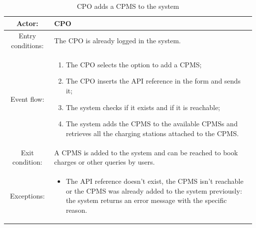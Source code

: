 \begin{table}[h]
    \begin{center}
        \begin{tabular}{|c||p{10cm}|}
            \hline
            Actor:            & \ac{CPO}                                                                                         \\
            \hline
            Entry conditions: & The \ac{CPO} is already logged in the system.                                                    \\
            \hline
            Event flow:       &
            \begin{enumerate}
                \item The \ac{CPO} selects the option to add a \ac{CPMS};
                \item The \ac{CPO} inserts the \ac{API} reference in the form and sends it;
                \item The system checks if it exists and if it is reachable;
                \item The system adds the \ac{CPMS} to the available \acp{CPMS} and retrieves all the charging stations attached to the \ac{CPMS}.
            \end{enumerate}
            \\
            \hline
            Exit condition:   & A \ac{CPMS} is added to the system and can be reached to book charges or other queries by users. \\
            \hline
            Exceptions:       &
            \begin{itemize}
                \item The API reference doesn't exist, the \ac{CPMS} isn't reachable or the \ac{CPMS} was already added to the system previously: the system returns an error message with the specific reason.
            \end{itemize}
            \\
            \hline
        \end{tabular}
    \end{center}
    \caption{\ac{CPO} adds a \ac{CPMS} to the system}
\end{table}

